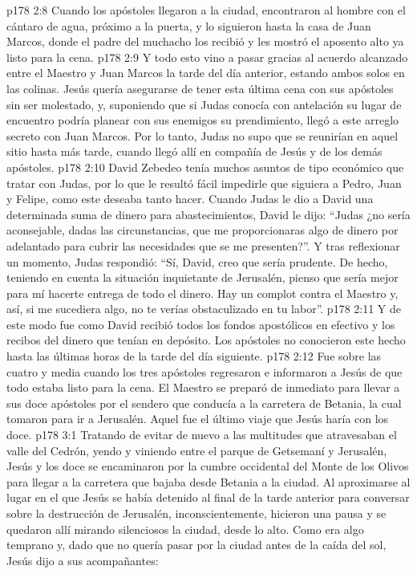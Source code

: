 \vs p178 2:8 Cuando los apóstoles llegaron a la ciudad, encontraron al hombre con el cántaro de agua, próximo a la puerta, y lo siguieron hasta la casa de Juan Marcos, donde el padre del muchacho los recibió y les mostró el aposento alto ya listo para la cena.
\vs p178 2:9 Y todo esto vino a pasar gracias al acuerdo alcanzado entre el Maestro y Juan Marcos la tarde del día anterior, estando ambos solos en las colinas. Jesús quería asegurarse de tener esta última cena con sus apóstoles sin ser molestado, y, suponiendo que si Judas conocía con antelación su lugar de encuentro podría planear con sus enemigos su prendimiento, llegó a este arreglo secreto con Juan Marcos. Por lo tanto, Judas no supo que se reunirían en aquel sitio hasta más tarde, cuando llegó allí en compañía de Jesús y de los demás apóstoles.
\vs p178 2:10 \pc David Zebedeo tenía muchos asuntos de tipo económico que tratar con Judas, por lo que le resultó fácil impedirle que siguiera a Pedro, Juan y Felipe, como este deseaba tanto hacer. Cuando Judas le dio a David una determinada suma de dinero para abastecimientos, David le dijo: “Judas ¿no sería aconsejable, dadas las circunstancias, que me proporcionaras algo de dinero por adelantado para cubrir las necesidades que se me presenten?”. Y tras reflexionar un momento, Judas respondió: “Sí, David, creo que sería prudente. De hecho, teniendo en cuenta la situación inquietante de Jerusalén, pienso que sería mejor para mí hacerte entrega de todo el dinero. Hay un complot contra el Maestro y, así, si me sucediera algo, no te verías obstaculizado en tu labor”.
\vs p178 2:11 Y de este modo fue como David recibió todos los fondos apostólicos en efectivo y los recibos del dinero que tenían en depósito. Los apóstoles no conocieron este hecho hasta las últimas horas de la tarde del día siguiente.
\vs p178 2:12 \pc Fue sobre las cuatro y media cuando los tres apóstoles regresaron e informaron a Jesús de que todo estaba listo para la cena. El Maestro se preparó de inmediato para llevar a sus doce apóstoles por el sendero que conducía a la carretera de Betania, la cual tomaron para ir a Jerusalén. Aquel fue el último viaje que Jesús haría con los doce.
\vs p178 3:1 Tratando de evitar de nuevo a las multitudes que atravesaban el valle del Cedrón, yendo y viniendo entre el parque de Getsemaní y Jerusalén, Jesús y los doce se encaminaron por la cumbre occidental del Monte de los Olivos para llegar a la carretera que bajaba desde Betania a la ciudad. Al aproximarse al lugar en el que Jesús se había detenido al final de la tarde anterior para conversar sobre la destrucción de Jerusalén, inconscientemente, hicieron una pausa y se quedaron allí mirando silenciosos la ciudad, desde lo alto. Como era algo temprano y, dado que no quería pasar por la ciudad antes de la caída del sol, Jesús dijo a sus acompañantes:
